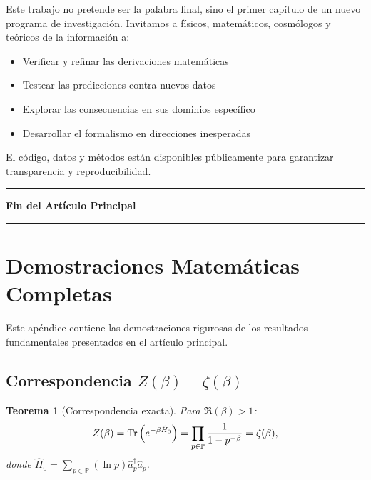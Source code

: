 \documentclass[11pt, a4paper]{article}
\theoremstyle{plain}
\newtheorem{teorema}{Teorema}[section]
\theoremstyle{definition}
\begin{document}
Este trabajo no pretende ser la palabra final, sino el primer capítulo de un nuevo programa de investigación. Invitamos a físicos, matemáticos, cosmólogos y teóricos de la información a:
\begin{itemize}
    \item Verificar y refinar las derivaciones matemáticas
    \item Testear las predicciones contra nuevos datos
    \item Explorar las consecuencias en sus dominios específico
    \item Desarrollar el formalismo en direcciones inesperadas
\end{itemize}

El código, datos y métodos están disponibles públicamente para garantizar transparencia y reproducibilidad.

\begin{center}
\rule{0.5\textwidth}{0.5pt}

\textbf{Fin del Artículo Principal}

\rule{0.5\textwidth}{0.5pt}
\end{center}


\appendix


\section{Demostraciones Matemáticas Completas}
\label{app:demostraciones}

Este apéndice contiene las demostraciones rigurosas de los resultados fundamentales presentados en el artículo principal.

\subsection{Correspondencia \texorpdfstring{$Z(\beta) = \zeta(\beta)$}{Z(β)=ζ(β)}}
\label{app:zeta_correspondence}

\begin{teorema}[Correspondencia exacta]
Para $\Re(\beta) > 1$:
\begin{equation}
Z(\beta) = \Tr\left(e^{-\beta \hat{H}_0}\right) = \prod_{p \in \mathbb{P}} \frac{1}{1 - p^{-\beta}} = \zeta(\beta),
\end{equation}
donde $\hat{H}_0 = \sum_{p \in \mathbb{P}} (\ln p) \hat{a}_p^\dagger \hat{a}_p$.
\end{teorema}
\end{document}
